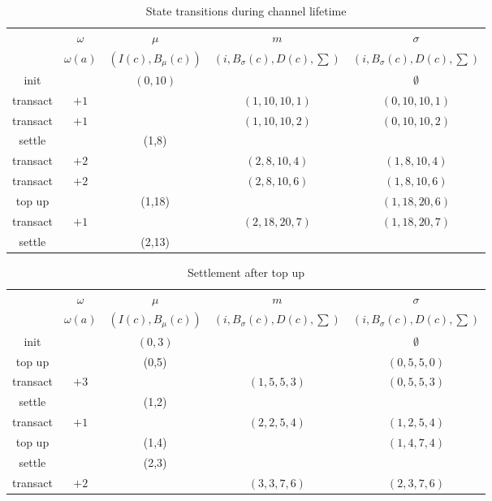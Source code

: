 \documentclass{llncs}
\begin{document}
\begin{table}[t]
  \begin{tabularx}{\textwidth}{| S | S | C | C | C |}
       & $\omega$ & $\mu$ & $m$ & $\sigma$ \\ 
       & $\omega(a)$ & $(I(c), B_\mu(c))$ & $(i, B_\sigma(c), D(c), \sum)$ & $(i, B_\sigma(c), D(c), \sum)$ \\
  \hhline{-====}
      init & & $(0,10)$ & & $\emptyset$ \\
      transact & $+1$ & & $(1, 10, 10, 1)$& $(0, 10, 10, 1)$ \\
      transact & $+1$ & & $(1, 10, 10, 2)$& $(0, 10, 10, 2)$ \\
      settle & & (1,8) & & \\
      transact & $+2$  & & $(2, 8, 10, 4)$ & $(1, 8, 10, 4)$ \\
      transact & $+2$  & & $(2, 8, 10, 6)$ & $(1, 8, 10, 6)$ \\
      top up & & (1,18) & & $(1, 18, 20, 6)$ \\
      transact & $+1$ & & $(2, 18, 20, 7)$ & $(1, 18, 20, 7)$ \\
      settle & & (2,13) & & \\
  \end{tabularx}
  \medskip
  \caption{State transitions during channel lifetime}
\end{table}


\begin{table}[t]
  \begin{tabularx}{\textwidth}{| S | S | C | C | C |}
       & $\omega$ & $\mu$ & $m$ & $\sigma$ \\ 
       & $\omega(a)$ & $(I(c), B_\mu(c))$ & $(i, B_\sigma(c), D(c), \sum)$ & $(i, B_\sigma(c), D(c), \sum)$ \\
  \hhline{-====}
      init & & $(0,3)$ & & $\emptyset$ \\
      top up & & (0,5) & & $(0, 5, 5, 0)$ \\
      transact & $+3$ & & $(1, 5, 5, 3)$ & $(0, 5, 5, 3)$ \\
      settle & & (1,2) & & \\
      transact & $+1$ & & $(2, 2, 5, 4)$ & $(1, 2, 5, 4)$ \\
      top up & & (1,4) & & $(1, 4, 7, 4)$ \\
      settle & & (2,3) & & \\
      transact & $+2$ & & $(3, 3, 7, 6)$ & $(2, 3, 7, 6)$ \\
  \end{tabularx}
  \medskip
  \caption{Settlement after top up}
\end{table}

%
%
\printbibliography
\end{document}
